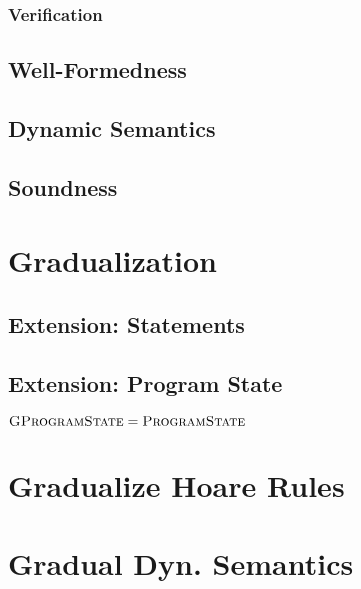         \subsubsection{Verification}
        \label{sssec:verification}
        
    
    \subsection{Well-Formedness}
    \label{sec:well-formedness}
    
    
    \subsection{Dynamic Semantics}
    \label{ssec:dynamic-semantics}
    
    
    \subsection{Soundness}

\section{Gradualization}
\label{sec:cs-gradual-formulas}


    \subsection{Extension: Statements}
    \label{ssec:extension--statements}
    

    \subsection{Extension: Program State}
    $\textsc{GProgramState} = \textsc{ProgramState}$

\section{Gradualize Hoare Rules}
\label{sec:gradualize-hoare-rules}


\section{Gradual Dyn. Semantics}


